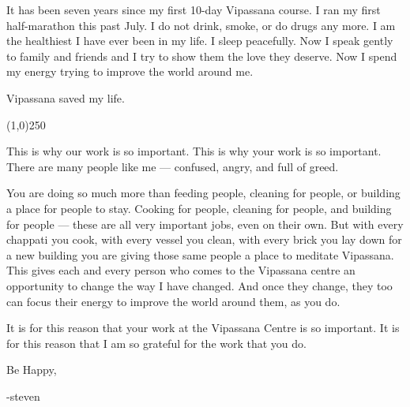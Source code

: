 \documentclass{article}
\begin{document}
It has been seven years since my first 10-day Vipassana course. I ran my first
half-marathon this past July. I do not drink, smoke, or do drugs any more. I am the
healthiest I have ever been in my life. I sleep peacefully. Now I speak gently to
family and friends and I try to show them the love they deserve. Now I spend my energy
trying to improve the world around me.

Vipassana saved my life.

\begin{center}
\line(1,0){250}
\end{center}

This is why our work is so important. This is why your work is so important. There
are many people like me --- confused, angry, and full of greed.

You are doing so much more than feeding people, cleaning for people,
or building a place for people to stay. Cooking for people, cleaning for people, and
building for people --- these are all very important jobs, even on their own. But
with every chappati you cook, with every vessel you clean, with every brick
you lay down for a new building you are giving those same people a place to meditate
Vipassana. This gives each and every person who comes to the Vipassana centre an
opportunity to change the way I have changed. And once they change, they too can
focus their energy to improve the world around them, as you do.

It is for this reason that your work at the Vipassana Centre is so important. It is
for this reason that I am so grateful for the work that you do.

Be Happy,

-steven
\end{document}
